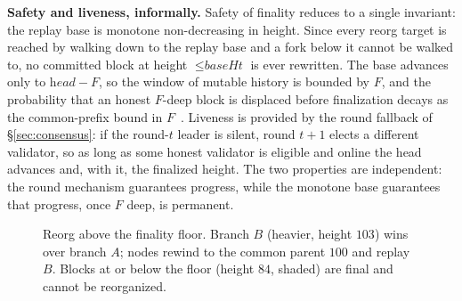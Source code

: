 \textbf{Safety and liveness, informally.} Safety of finality reduces to a single invariant: the
replay base is monotone non-decreasing in height. Since every reorg target is reached by walking
down to the replay base and a fork below it cannot be walked to, no committed block at height
$\le \textit{baseHt}$ is ever rewritten. The base advances only to $\textit{head}-F$, so the
window of mutable history is bounded by $F$, and the probability that an honest $F$-deep block is
displaced before finalization decays as the common-prefix bound in
$F$~\cite{garay2015backbone,sompolinsky2015ghost}. Liveness is provided by the round fallback of
\S\ref{sec:consensus}: if the round-$t$ leader is silent, round $t{+}1$ elects a different
validator, so as long as some honest validator is eligible and online the head advances and, with
it, the finalized height. The two properties are independent: the round mechanism guarantees
progress, while the monotone base guarantees that progress, once $F$ deep, is permanent.

\begin{figure}[t]
\centering
{}
\caption{Reorg above the finality floor. Branch $B$ (heavier, height $103$) wins over branch $A$;
nodes rewind to the common parent $100$ and replay $B$. Blocks at or below the floor (height $84$,
shaded) are final and cannot be reorganized.}
\label{fig:reorg}
\end{figure}

